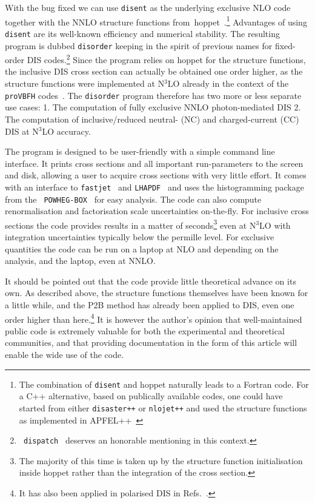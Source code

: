 \documentclass[submission, PhysCodeb]{SciPost}
\newcommand{\hoppet}{{\sc hoppet}}
\newcommand{\disent}{{\tt disent}}
\newcommand{\disorder}{{\tt disorder}}
\newcommand{\provbfh}{{\tt proVBFH}}
\newcommand{\fastjet}{{\tt fastjet}}
\newcommand{\lhapdf}{{\tt LHAPDF}}
\newcommand{\disaster}{{\tt disaster++}}
\newcommand{\nlojet}{{\tt nlojet++}}
\newcommand{\NNNLO}{N$^3$LO}
\begin{document}
With the bug fixed we can use \disent{} as the underlying exclusive
NLO code together with the NNLO structure functions
from~\hoppet{}~\cite{Salam:2008qg,BertoneKarlberg}.\footnote{The
combination of \disent{} and \hoppet{} naturally leads to a Fortran
code. For a C++ alternative, based on publically available codes, one
could have started from either \disaster{} or \nlojet{} and used the
structure functions as implemented in
APFEL++~\cite{Bertone:2013vaa,Bertone:2017gds}} Advantages of using
\disent{} are its well-known efficiency and numerical stability. The
resulting program is dubbed \disorder{} keeping in the spirit of
previous names for fixed-order DIS codes.\footnote{{\tt
  dispatch}~\cite{Dasgupta:2002dc} deserves an honorable mentioning in
this context.} Since the program relies on \hoppet{} for the structure
functions, the inclusive DIS cross section can actually be obtained
one order higher, as the structure functions were implemented at
\NNNLO{} already in the context of the \provbfh{}
codes~\cite{Cacciari:2015jma,Dreyer:2016oyx,Dreyer:2018qbw,Dreyer:2018rfu}. The
\disorder{} program therefore has two more or less separate use cases:
1. The computation of fully exclusive NNLO photon-mediated DIS 2. The
computation of inclusive/reduced neutral- (NC) and charged-current
(CC) DIS at \NNNLO{} accuracy.

The program is designed to be user-friendly with a simple command line
interface. It prints cross sections and all important run-parameters
to the screen and disk, allowing a user to acquire cross sections with
very little effort. It comes with an interface to
\fastjet{}~\cite{Cacciari:2011ma} and \lhapdf{}~\cite{Buckley:2014ana}
and uses the histogramming package from the {\tt
  POWHEG-BOX}~\cite{Alioli:2010xd} for easy analysis. The code can
also compute renormalisation and factorisation scale uncertainties
on-the-fly. For inclusive cross sections the code provides results in
a matter of seconds\footnote{The majority of this time is taken up by
the structure function initialisation inside \hoppet{} rather than the
integration of the cross section.} even at \NNNLO{} with integration
uncertainties typically below the permille level. For exclusive
quantities the code can be run on a laptop at NLO and depending on the
analysis, and the laptop, even at NNLO.

It should be pointed out that the code provide little theoretical
advance on its own. As described above, the structure functions
themselves have been known for a little while, and the P2B method has
already been applied to DIS, even one order higher than
here.\footnote{It has also been applied in polarised DIS in
Refs.~\cite{Borsa:2020ulb,Borsa:2020yxh,Borsa:2021afb,Borsa:2022irn,Borsa:2022cap}.}
It is however the author's opinion that well-maintained public code is
extremely valuable for both the experimental and theoretical
communities, and that providing documentation in the form of this
article will enable the wide use of the code.
\end{document}
